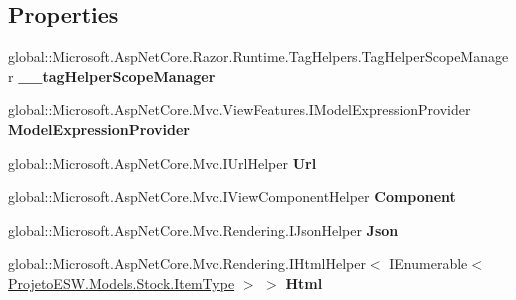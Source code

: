 \subsection*{Properties}
\begin{DoxyCompactItemize}
\item 
\mbox{\label{class_asp_net_core_1_1_views___item_types___index_a8581a94d9521b8156785b4a257bacdcf}} 
global\+::\+Microsoft.\+Asp\+Net\+Core.\+Razor.\+Runtime.\+Tag\+Helpers.\+Tag\+Helper\+Scope\+Manager {\bfseries \+\_\+\+\_\+tag\+Helper\+Scope\+Manager}
\item 
\mbox{\label{class_asp_net_core_1_1_views___item_types___index_aa15bc4b4a9f8fa04f25750def451dc9e}} 
global\+::\+Microsoft.\+Asp\+Net\+Core.\+Mvc.\+View\+Features.\+I\+Model\+Expression\+Provider {\bfseries Model\+Expression\+Provider}
\item 
\mbox{\label{class_asp_net_core_1_1_views___item_types___index_afb0919e7d41c1fc2fdc989d38bad488b}} 
global\+::\+Microsoft.\+Asp\+Net\+Core.\+Mvc.\+I\+Url\+Helper {\bfseries Url}
\item 
\mbox{\label{class_asp_net_core_1_1_views___item_types___index_af376234885efe3b1d359cb7414893f75}} 
global\+::\+Microsoft.\+Asp\+Net\+Core.\+Mvc.\+I\+View\+Component\+Helper {\bfseries Component}
\item 
\mbox{\label{class_asp_net_core_1_1_views___item_types___index_a9b00c05b6f2fd5ac8bc8ad1452cf570d}} 
global\+::\+Microsoft.\+Asp\+Net\+Core.\+Mvc.\+Rendering.\+I\+Json\+Helper {\bfseries Json}
\item 
\mbox{\label{class_asp_net_core_1_1_views___item_types___index_aa15f5977be7331cc75758c473b096b61}} 
global\+::\+Microsoft.\+Asp\+Net\+Core.\+Mvc.\+Rendering.\+I\+Html\+Helper$<$ I\+Enumerable$<$ \mbox{\hyperlink{class_projeto_e_s_w_1_1_models_1_1_stock_1_1_item_type}{Projeto\+E\+S\+W.\+Models.\+Stock.\+Item\+Type}} $>$ $>$ {\bfseries Html}
\end{DoxyCompactItemize}

